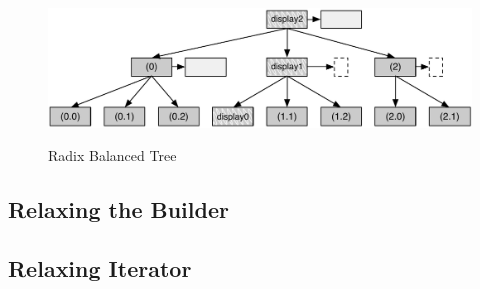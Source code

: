 \begin{figure}[h!]
  \centering
  \includegraphics[width=\textwidth]{Figures/Balanced_subtrees}
  \label{Balanced_subtrees}
  \caption{Radix Balanced Tree}
\end{figure}


\subsection{Relaxing the Builder}


\subsection{Relaxing Iterator}



